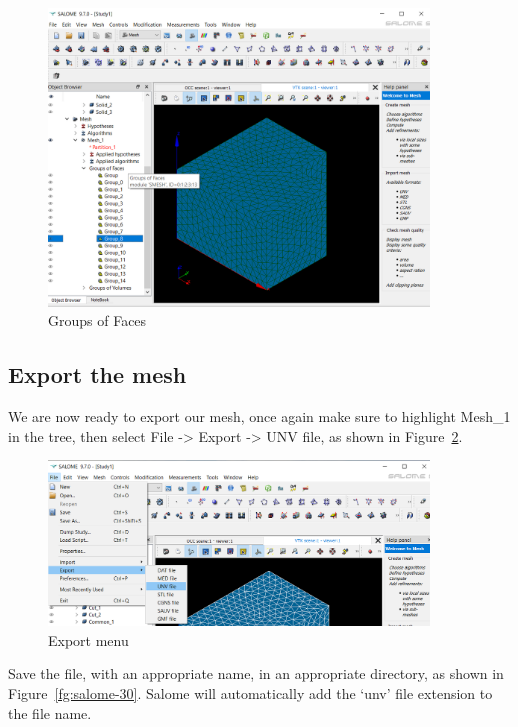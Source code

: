 \begin{figure}[H]
\centering
\includegraphics[width=0.9\textwidth]{Salome-28}
\caption{Groups of Faces}\label{fg:salome-28}
\end{figure}

\subsection{Export the mesh}

We are now ready to export our mesh, once again make sure to highlight Mesh\_1 in the tree, then select File -> Export -> UNV file, as shown in Figure~\ref{fg:salome-29}.

\begin{figure}[H]
\centering
\includegraphics[width=0.9\textwidth]{Salome-29}
\caption{Export menu}\label{fg:salome-29}
\end{figure}

Save the file, with an appropriate name, in an appropriate directory, as shown in Figure~\ref{fg:salome-30}.  Salome will automatically add the `unv' file extension to the file name.

